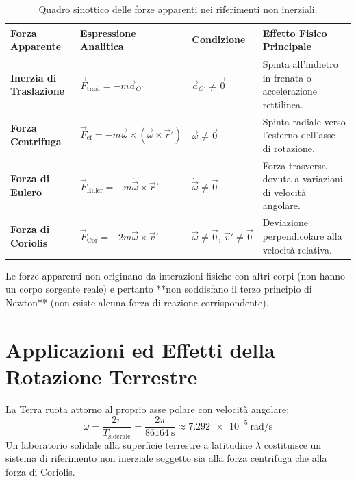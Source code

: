 \begin{table}[htbp]
\centering
\caption{Quadro sinottico delle forze apparenti nei riferimenti non inerziali.}
\label{tab:forze_apparenti}
\begin{tabularx}{\textwidth}{p{3.2cm} p{3.8cm} p{3.2cm} X}
\toprule
\textbf{Forza Apparente} & \textbf{Espressione Analitica} & \textbf{Condizione} & \textbf{Effetto Fisico Principale} \\
\midrule
\textbf{Inerzia di Traslazione} & $\vec{F}_{\text{trasl}} = -m\vec{a}_{O'}$ & $\vec{a}_{O'} \neq \vec{0}$ & Spinta all'indietro in frenata o accelerazione rettilinea. \\
\textbf{Forza Centrifuga} & $\vec{F}_{\text{cf}} = -m\vec{\omega}\times(\vec{\omega}\times\vec{r}')$ & $\vec{\omega} \neq \vec{0}$ & Spinta radiale verso l'esterno dell'asse di rotazione. \\
\textbf{Forza di Eulero} & $\vec{F}_{\text{Euler}} = -m\dot{\vec{\omega}}\times\vec{r}'$ & $\dot{\vec{\omega}} \neq \vec{0}$ & Forza trasversa dovuta a variazioni di velocità angolare. \\
\textbf{Forza di Coriolis} & $\vec{F}_{\text{Cor}} = -2m\vec{\omega}\times\vec{v}'$ & $\vec{\omega} \neq \vec{0}, \, \vec{v}' \neq \vec{0}$ & Deviazione perpendicolare alla velocità relativa. \\
\bottomrule
\end{tabularx}
\end{table}

\begin{esame}
Le forze apparenti non originano da interazioni fisiche con altri corpi (non hanno un corpo sorgente reale) e pertanto **non soddisfano il terzo principio di Newton** (non esiste alcuna forza di reazione corrispondente).
\end{esame}

\section{Applicazioni ed Effetti della Rotazione Terrestre}
\label{sec:applicazioni_terra}

La Terra ruota attorno al proprio asse polare con velocità angolare:
\begin{equation}
    \omega = \frac{2\pi}{T_{\text{siderale}}} = \frac{2\pi}{\SI{86164}{\second}} \approx \SI{7.292e-5}{\radian\per\second}
\end{equation}
Un laboratorio solidale alla superficie terrestre a latitudine $\lambda$ costituisce un sistema di riferimento non inerziale soggetto sia alla forza centrifuga che alla forza di Coriolis.

